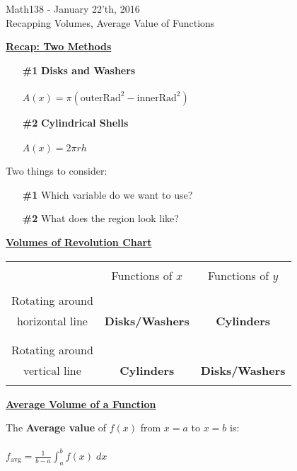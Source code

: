 \documentclass{letter}
\newcommand{\0}[1]{\begin{bmatrix}#1\end{bmatrix}}
\newcommand{\h}[1]{\underline{\textbf{#1}}}
\begin{document}
	\begin{center}
		\LARGE Math138 - January 22'th, 2016\\
		\large Recapping Volumes, Average Value of Functions
	\end{center}
	\vspace{0.25 in}
	
	\h{Recap: Two Methods}

	\begin{itemize}
		\item[\textbf{\#1}] \textbf{Disks and Washers}\\\\
		$A(x) = \pi(\text{outerRad}^2 - \text{innerRad}^2)$
		\item[\textbf{\#2}] \textbf{Cylindrical Shells}\\\\
		$A(x) = 2\pi rh$
	\end{itemize}
	
	Two things to consider:
	
	\begin{itemize}
		\item[\textbf{\#1}] Which variable do we want to use?
		\item[\textbf{\#2}] What does the region look like?
	\end{itemize}
	
	\h{Volumes of Revolution Chart}
	
	\begin{tabular}{|c|c|c|}
		\hline&&\\
		&Functions of $x$&Functions of $y$\\
		\hline&&\\
		Rotating around&&\\horizontal line&\textbf{Disks/Washers}&\textbf{Cylinders}\\&&\\
		\hline&&\\
		Rotating around&&\\
	vertical line&\textbf{Cylinders}&\textbf{Disks/Washers}\\&&\\
		\hline
	\end{tabular}
	
	\h{Average Volume of a Function}
	
	The \textbf{Average value} of $f(x)$ from $x=a$ to $x=b$ is:\\\\
	$\displaystyle f_{\text{avg}} = \frac{1}{b-a} \int_a^b f(x)\; dx$
\end{document}
